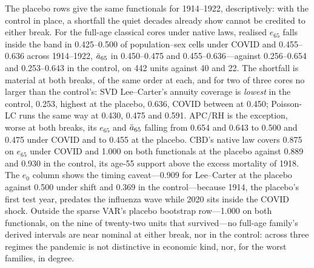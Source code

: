The placebo rows give the same functionals for 1914--1922, descriptively: with
the control in place, a shortfall the quiet decades already show cannot be
credited to either break. For the full-age classical cores under native laws,
realised $e_{65}$ falls inside the band in 0.425--0.500 of
population--sex cells under COVID and 0.455--0.636 across 1914--1922,
$\ddot{a}_{65}$ in 0.450--0.475 and 0.455--0.636---against 0.256--0.654 and
0.253--0.643 in the control, on 442 units against 40 and 22. The shortfall is
material at both breaks, of the same order at each, and for two of three cores
no larger than the control's: SVD Lee--Carter's annuity coverage is
\emph{lowest} in the control, 0.253, highest at the placebo, 0.636, COVID
between at 0.450; Poisson-LC runs the same way at 0.430, 0.475 and 0.591.
APC/RH is the exception, worse at both breaks, its $e_{65}$ and $\ddot{a}_{65}$
falling from 0.654 and 0.643 to 0.500 and 0.475 under COVID and to 0.455 at the
placebo. CBD's native law covers 0.875 on $e_{65}$ under COVID and 1.000 on
both functionals at the placebo against 0.889 and 0.930 in the control, its
age-55 support above the excess mortality of 1918. The $e_0$ column shows
the timing caveat---0.909 for Lee--Carter at the placebo against 0.500 under
shift and 0.369 in the control---because 1914, the placebo's first test year,
predates the influenza wave while 2020 sits inside the COVID shock. Outside the
sparse VAR's placebo bootstrap row---1.000 on both functionals, on the nine of
twenty-two units that survived---no full-age family's derived intervals
are near nominal at either break, nor in the control: across three regimes the pandemic is not distinctive in economic kind, nor, for the worst
families, in degree.
